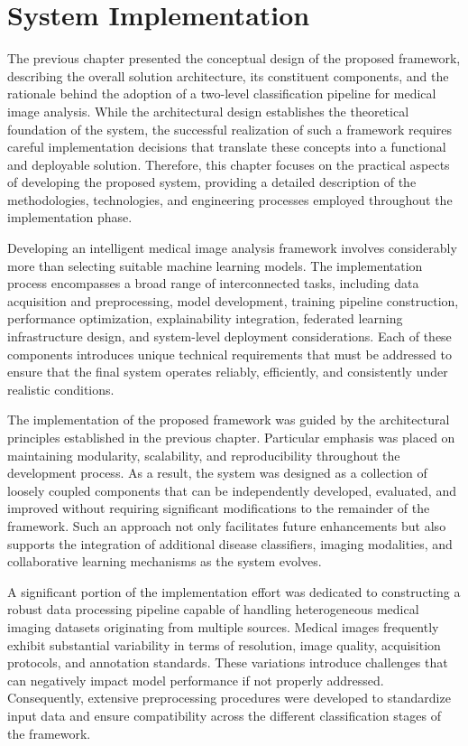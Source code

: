 \chapter{System Implementation}
\label{chap:system_implementation}

The previous chapter presented the conceptual design of the proposed framework, describing the overall solution architecture, its constituent components, and the rationale behind the adoption of a two-level classification pipeline for medical image analysis. While the architectural design establishes the theoretical foundation of the system, the successful realization of such a framework requires careful implementation decisions that translate these concepts into a functional and deployable solution. Therefore, this chapter focuses on the practical aspects of developing the proposed system, providing a detailed description of the methodologies, technologies, and engineering processes employed throughout the implementation phase.

Developing an intelligent medical image analysis framework involves considerably more than selecting suitable machine learning models. The implementation process encompasses a broad range of interconnected tasks, including data acquisition and preprocessing, model development, training pipeline construction, performance optimization, explainability integration, federated learning infrastructure design, and system-level deployment considerations. Each of these components introduces unique technical requirements that must be addressed to ensure that the final system operates reliably, efficiently, and consistently under realistic conditions.

The implementation of the proposed framework was guided by the architectural principles established in the previous chapter. Particular emphasis was placed on maintaining modularity, scalability, and reproducibility throughout the development process. As a result, the system was designed as a collection of loosely coupled components that can be independently developed, evaluated, and improved without requiring significant modifications to the remainder of the framework. Such an approach not only facilitates future enhancements but also supports the integration of additional disease classifiers, imaging modalities, and collaborative learning mechanisms as the system evolves.

A significant portion of the implementation effort was dedicated to constructing a robust data processing pipeline capable of handling heterogeneous medical imaging datasets originating from multiple sources. Medical images frequently exhibit substantial variability in terms of resolution, image quality, acquisition protocols, and annotation standards. These variations introduce challenges that can negatively impact model performance if not properly addressed. Consequently, extensive preprocessing procedures were developed to standardize input data and ensure compatibility across the different classification stages of the framework.

